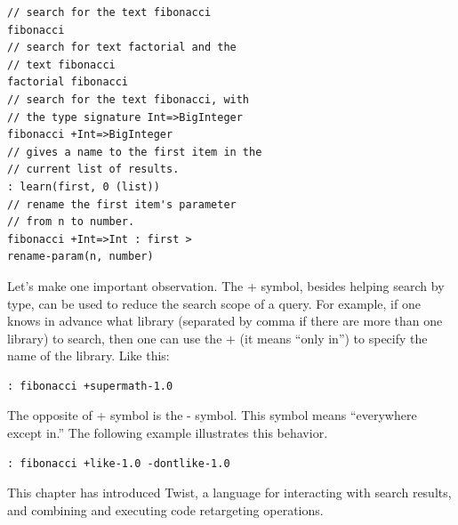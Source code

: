 \begin{verbatim}
// search for the text fibonacci	
fibonacci
// search for text factorial and the 
// text fibonacci
factorial fibonacci
// search for the text fibonacci, with 
// the type signature Int=>BigInteger 
fibonacci +Int=>BigInteger 
// gives a name to the first item in the 
// current list of results.
: learn(first, 0 (list))
// rename the first item's parameter 
// from n to number.
fibonacci +Int=>Int : first > 
rename-param(n, number) 
\end{verbatim}
	 
Let's make one important observation. The + symbol, besides helping search by type, can be used to reduce the search scope of a query. For example, if one knows in advance what library (separated by comma if there are more than one library) to search, then one can use the + (it means ``only in'') to specify the name of the library. Like this:

\begin{verbatim}
: fibonacci +supermath-1.0 
\end{verbatim}

The opposite of + symbol is the - symbol. This symbol means ``everywhere except in.'' The following example illustrates this behavior.

\begin{verbatim}
: fibonacci +like-1.0 -dontlike-1.0
\end{verbatim}
 
 
This chapter has introduced Twist, a language for interacting with search results, and combining and executing code retargeting operations. 
